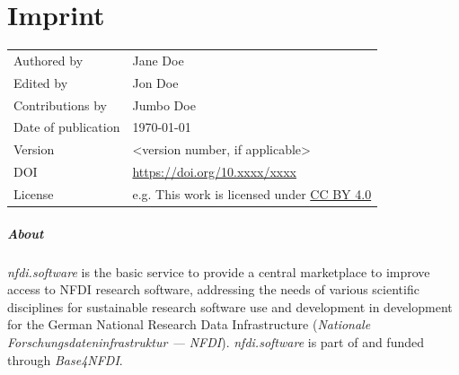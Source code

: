 \documentclass[headsepline,titlepage,twoside,12pt,toc=flat,headings=normal]{scrreprt}
\author{\theauthor}
\date{\thedate}
\title{\thetitle}
\subtitle{Subtitle (optional)}
\newcommand{\thetitle}{Title}
\newcommand{\thedate}{\today}
\newcommand{\theauthor}{Jane Doe}
\newcommand{\theeditor}{Jon Doe}
\newcommand{\thecontributor}{Jumbo Doe}
\begin{document}
\allowdisplaybreaks%

\maketitle

\chapter*{Imprint}\label{ch:imprint}

\begin{tabular}{ll}
Authored by			&\theauthor\\
Edited by			&\theeditor\\
Contributions by	&\thecontributor\\
Date of publication	&\thedate\\
Version				&<version number, if applicable>\\
DOI					&\url{https://doi.org/10.xxxx/xxxx}\\
License				&e.g. This work is licensed under \href{https://creativecommons.org/licenses/by/4.0/}{CC BY 4.0}\\
\end{tabular}

\paragraph{About}
\emph{nfdi.software} is the basic service to provide a central marketplace to improve access to NFDI research software,
addressing the needs of various scientific disciplines for sustainable research software use and development in development for the German National Research Data Infrastructure (\emph{Nationale Forschungsdateninfrastruktur --- NFDI}).
\emph{nfdi.software} is part of and funded through \emph{Base4NFDI}.
\end{document}
